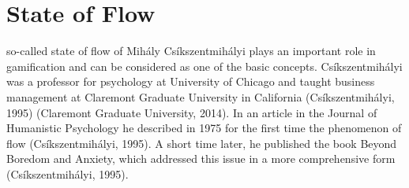 \section{State of Flow}
so-called state of flow of Mihály Csíkszentmihályi plays an
important role in gamification and can be considered as one of the basic concepts. Csíkszentmihályi
was a professor for psychology at University of Chicago and taught business
management at Claremont Graduate University in California (Csíkszentmihályi, 1995)
(Claremont Graduate University, 2014). In an article in the Journal of Humanistic Psychology
he described in 1975 for the first time the phenomenon of flow (Csíkszentmihályi,
1995). A short time later, he published the book Beyond Boredom and Anxiety, which
addressed this issue in a more comprehensive form (Csíkszentmihályi, 1995).